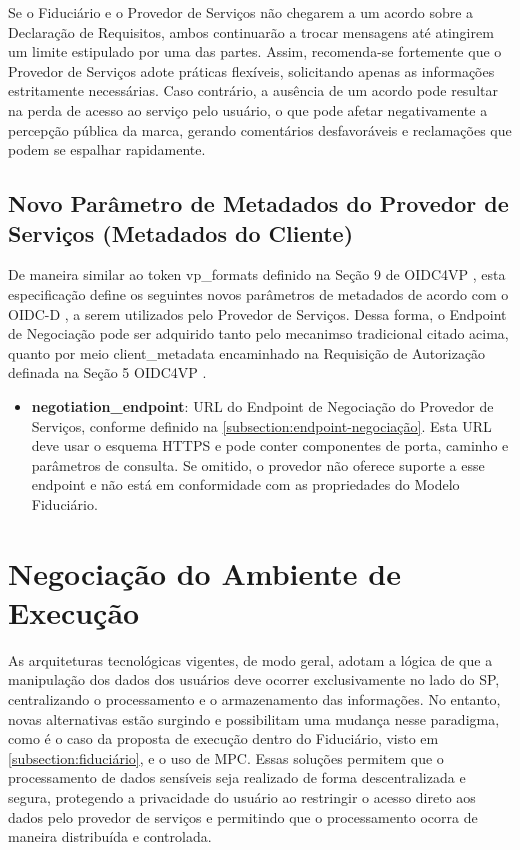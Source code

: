 Se o Fiduciário e o Provedor de Serviços não chegarem a um acordo sobre a Declaração de Requisitos, ambos continuarão a trocar mensagens até atingirem um limite estipulado por uma das partes. Assim, recomenda-se fortemente que o Provedor de Serviços adote práticas flexíveis, solicitando apenas as informações estritamente necessárias. Caso contrário, a ausência de um acordo pode resultar na perda de acesso ao serviço pelo usuário, o que pode afetar negativamente a percepção pública da marca, gerando comentários desfavoráveis e reclamações que podem se espalhar rapidamente.

\subsection{Novo Parâmetro de Metadados do Provedor de Serviços (Metadados do Cliente)}

De maneira similar ao token vp\_formats definido na Seção 9 de \acs{OIDC4VP} \cite{OIDC4VP2023}, esta especificação define os seguintes novos parâmetros de metadados de acordo com o \acs{OIDC-D} \cite{sakimura2023openidDiscovery}, a serem utilizados pelo Provedor de Serviços. Dessa forma, o Endpoint de Negociação pode ser adquirido tanto pelo mecanimso tradicional citado acima, quanto por meio client\_metadata encaminhado na Requisição de Autorização definada na Seção 5 \acs{OIDC4VP} \cite{OIDC4VP2023}.

\begin{itemize}
    \item \textbf{negotiation\_endpoint}: URL do Endpoint de Negociação do Provedor de Serviços, conforme definido na \autoref{subsection:endpoint-negociação}. Esta URL deve usar o esquema HTTPS e pode conter componentes de porta, caminho e parâmetros de consulta. Se omitido, o provedor não oferece suporte a esse endpoint e não está em conformidade com as propriedades do Modelo Fiduciário.
\end{itemize}


% 



\clearpage
\section{Negociação do Ambiente de Execução}\label{section:env-negotiation}

As arquiteturas tecnológicas vigentes, de modo geral, adotam a lógica de que a manipulação dos dados dos usuários deve ocorrer exclusivamente no lado do \acs{SP}, centralizando o processamento e o armazenamento das informações. No entanto, novas alternativas estão surgindo e possibilitam uma mudança nesse paradigma, como é o caso da proposta de execução dentro do Fiduciário, visto em \autoref{subsection:fiduciário}, e o uso de \acs{MPC}. Essas soluções permitem que o processamento de dados sensíveis seja realizado de forma descentralizada e segura, protegendo a privacidade do usuário ao restringir o acesso direto aos dados pelo provedor de serviços e permitindo que o processamento ocorra de maneira distribuída e controlada. 

